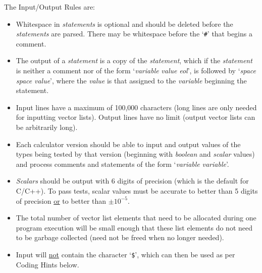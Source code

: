 \documentclass[12pt]{article}
\begin{document}
The Input/Output Rules are:
\begin{indpar}{0.2in}\begin{itemize}

\item Whitespace in {\em statements} is optional and should be deleted
before the {\em statements} are parsed.  There may be whitespace
before the `{\tt \#}' that begins a comment.

\item The output of a {\em statement} is a copy of the {\em statement},
which if the {\em statement} is neither a comment nor of the form
`{\em variable} \TT{=} {\em value} {\em eol}', 
is followed by `{\em space} \TT{=} {\em space} {\em value}', where
the {\em value} is that assigned to the {\em variable} beginning the
statement.

\item Input lines have a maximum of 100,000 characters (long lines
are only needed for inputting vector lists).  Output lines have
no limit (output vector lists can be arbitrarily long).

\item Each calculator version should be able to input and output
values of the types being tested by that version (beginning with
{\em boolean} and {\em scalar} values) and process comments
and statements of the form `{\em variable} \TT{=} {\em variable}'.

\item {\em Scalars} should be output with 6 digits of precision
(which is the default for C/C++).  To pass tests, scalar values
must be accurate to better than 5 digits of precision \underline{or}
to better than $\pm 10^{-5}$.

\item  The total number of vector list elements that need to be
allocated during one program execution will be small enough
that these list elements do not need to be garbage collected
(need not be freed when no longer needed).

\item Input will \underline{not} contain the character `{\tt \$}',
which can then be used as per Coding Hints below.


\end{itemize}\end{indpar}

\newpage
\end{document}
